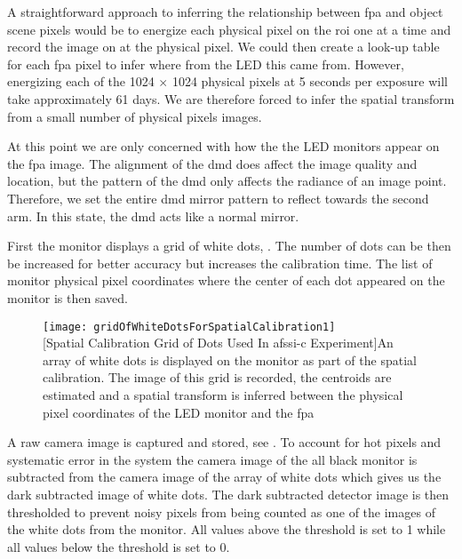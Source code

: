 A straightforward approach to inferring the relationship between \gls{fpa} and object scene pixels would be to energize each physical pixel on the \gls{roi} one at a time and record the image on at the physical pixel. We could then create a look-up table for each \gls{fpa} pixel to infer where from the LED this came from. However, energizing each of the 1024 $\times$ 1024 physical pixels at 5 seconds per exposure will take approximately 61 days. We are therefore forced to infer the spatial transform from a small number of physical pixels images.

At this point we are only concerned with how the the LED monitors appear on the \gls{fpa} image. The alignment of the \gls{dmd} does affect the image quality and location, but the pattern of the \gls{dmd} only affects the radiance of an image point. Therefore, we set the entire \gls{dmd} mirror pattern to reflect towards the second arm. In this state, the \gls{dmd} acts like a normal mirror. 

First the monitor displays a grid of white dots, . The number of dots can be then be increased for better accuracy but increases the calibration time. The list of monitor physical pixel coordinates where the center of each dot appeared on the monitor is then saved.

\begin{figure}[htb]
	\centering
	\texttt{[image: gridOfWhiteDotsForSpatialCalibration1]}\\
	[Spatial Calibration Grid of Dots Used In \gls{afssi-c} Experiment]{An array of white dots is displayed on the monitor as part of the spatial calibration. The image of this grid is recorded, the centroids are estimated and a spatial transform is inferred between the physical pixel coordinates of the LED monitor and the \gls{fpa}}
	\label{fig:gridOfWhiteDotsForSpatialCalibration1}
\end{figure}

A raw camera image is captured and stored, see . To account for hot pixels and systematic error in the system the camera image of the all black monitor is subtracted from the camera image of the array of white dots which gives us the dark subtracted image of white dots. The dark subtracted detector image is then thresholded to prevent noisy pixels from being counted as one of the images of the white dots from the monitor. All values above the threshold is set to 1 while all values below the threshold is set to 0.

